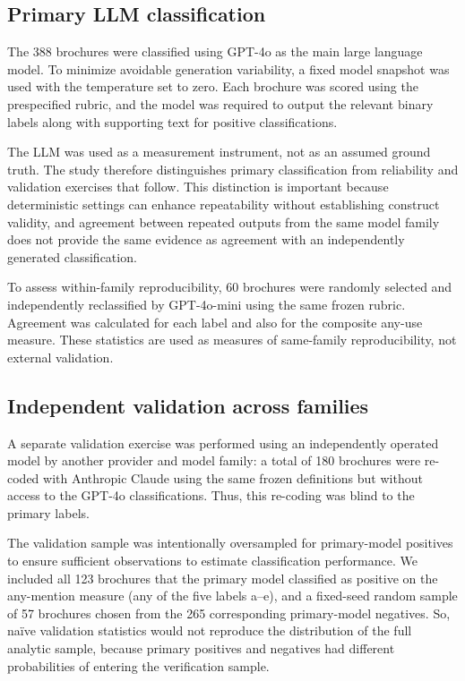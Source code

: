 \documentclass[utf8]{FrontiersinHarvard}
\begin{document}
\subsection{Primary LLM classification}

The 388 brochures were classified using GPT-4o as the main large language model. To minimize avoidable generation variability, a fixed model snapshot was used with the temperature set to zero. Each brochure was scored using the prespecified rubric, and the model was required to output the relevant binary labels along with supporting text for positive classifications.

The LLM was used as a measurement instrument, not as an assumed ground truth. The study therefore distinguishes primary classification from reliability and validation exercises that follow. This distinction is important because deterministic settings can enhance repeatability without establishing construct validity, and agreement between repeated outputs from the same model family does not provide the same evidence as agreement with an independently generated classification.

To assess within-family reproducibility, 60 brochures were randomly selected and independently reclassified by GPT-4o-mini using the same frozen rubric. Agreement was calculated for each label and also for the composite any-use measure. These statistics are used as measures of same-family reproducibility, not external validation.

\subsection{Independent validation across families}

A separate validation exercise was performed using an independently operated model by another provider and model family: a total of 180 brochures were re-coded with Anthropic Claude using the same frozen definitions but without access to the GPT-4o classifications. Thus, this re-coding was blind to the primary labels.

The validation sample was intentionally oversampled for primary-model positives to ensure sufficient observations to estimate classification performance. We included all 123 brochures that the primary model classified as positive on the any-mention measure (any of the five labels a--e), and a fixed-seed random sample of 57 brochures chosen from the 265 corresponding primary-model negatives. So, na\"ive validation statistics would not reproduce the distribution of the full analytic sample, because primary positives and negatives had different probabilities of entering the verification sample.
\end{document}
